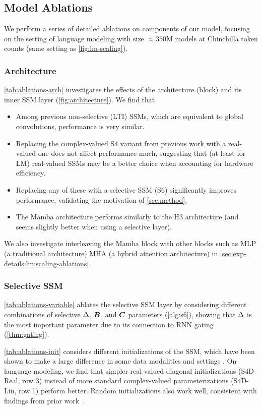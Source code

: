\subsection{Model Ablations}
\label{sec:exp:ablations}

We perform a series of detailed ablations on components of our model,
focusing on the setting of language modeling with size $\approx 350$M models at Chinchilla token counts (same setting as \cref{fig:lm-scaling}).

\subsubsection{Architecture}
\cref{tab:ablations-arch} investigates the effects of the architecture (block) and its inner SSM layer (\cref{fig:architecture}).
We find that
\begin{itemize}[leftmargin=*,itemsep=0pt]
  \item Among previous non-selective (LTI) SSMs, which are equivalent to global convolutions, performance is very similar.
  \item Replacing the complex-valued S4 variant from previous work with a real-valued one does not affect performance much,
    suggesting that (at least for LM) real-valued SSMs may be a better choice when accounting for hardware efficiency.
  \item Replacing any of these with a selective SSM (S6) significantly improves performance, validating the motivation of \cref{sec:method}.
  \item The Mamba architecture performs similarly to the H3 architecture (and seems slightly better when using a selective layer).
\end{itemize}

We also investigate interleaving the Mamba block with other blocks such as MLP (a traditional architecture) MHA (a hybrid attention architecture)
in \cref{sec:exp-details:lm:scaling-ablations}.

\subsubsection{Selective SSM}

\cref{tab:ablations-variable} ablates the selective SSM layer by considering different combinations of selective $\Delta$, $\bm{B}$, and $\bm{C}$ parameters (\cref{alg:s6}),
showing that $\Delta$ is the most important parameter due to its connection to RNN gating (\cref{thm:gating}).

\cref{tab:ablations-init} considers different initializations of the SSM, which have been shown to make a large difference in some data modalities and settings \citep{gu2022efficiently,gu2022parameterization}.
On language modeling, we find that simpler real-valued diagonal initializations (S4D-Real, row 3) instead of more standard complex-valued parameterizations (S4D-Lin, row 1)
perform better.
Random initializations also work well, consistent with findings from prior work~\citep{mehta2023long}.

